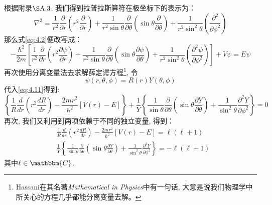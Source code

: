 \documentclass[a4paper,zihao=-4,linespread=1]{ctexrep}
\begin{document}
    根据附录$\S \rm{A}.3$, 我们得到拉普拉斯算符在极坐标下的表示为：
    \begin{equation}
        \nabla^{2}=\frac{1}{r^{2}} \frac{\partial}{\partial r}\left(r^{2} \frac{\partial}{\partial r}\right)+\frac{1}{r^{2} \sin \theta} \frac{\partial}{\partial \theta}\left(\sin \theta \frac{\partial}{\partial \theta}\right)+\frac{1}{r^{2} \sin ^{2} \theta}\left(\frac{\partial^{2}}{\partial \phi^{2}}\right)
    \end{equation}
    那么式\ref{eq:4.2}便改写成：
    \begin{equation}
        \label{eq:4.11}
        -\frac{\hbar^{2}}{2 m}\left[\frac{1}{r^{2}} \frac{\partial}{\partial r}\left(r^{2} \frac{\partial \psi}{\partial r}\right)+\frac{1}{r^{2} \sin \theta} \frac{\partial}{\partial \theta}\left(\sin \theta \frac{\partial \psi}{\partial \theta}\right)+\frac{1}{r^{2} \sin ^{2} \theta}\left(\frac{\partial^{2} \psi}{\partial \phi^{2}}\right)\right]+V \psi=E \psi
    \end{equation}
    再次使用分离变量法去求解薛定谔方程\footnote{Hassani在其名著\textit{Mathematical in Physics}中有一句话, 大意是说我们物理学中所关心的方程几乎都能分离变量去解。}, 令
    \[\psi(r,\theta,\phi)=R(r)Y(\theta,\phi)\]
    代入\ref{eq:4.11}得到:
    \begin{equation}
        \left\{\frac{1}{R} \frac{d}{d r}\left(r^{2} \frac{d R}{d r}\right)-\frac{2 m r^{2}}{\hbar^{2}}[V(r)-E]\right\}+\frac{1}{Y}\left\{\frac{1}{\sin \theta} \frac{\partial}{\partial \theta}\left(\sin \theta \frac{\partial Y}{\partial \theta}\right)+\frac{1}{\sin ^{2} \theta} \frac{\partial^{2} Y}{\partial \phi^{2}}\right\}=0
    \end{equation}
    再次, 我们又利用到两项依赖于不同的独立变量, 得到：
    \begin{align}
        &\frac{1}{R} \frac{d}{d r}\left(r^{2} \frac{d R}{d r}\right)-\frac{2 m r^{2}}{\hbar^{2}}[V(r)-E]=\ell(\ell+1) \label{eq:4.13}\\
        &\frac{1}{Y}\left\{\frac{1}{\sin \theta} \frac{\partial}{\partial \theta}\left(\sin \theta \frac{\partial Y}{\partial \theta}\right)+\frac{1}{\sin ^{2} \theta} \frac{\partial^{2} Y}{\partial \phi^{2}}\right\}=-\ell(\ell+1)\label{eq:4.14}
    \end{align}
    其中$\ell\in\mathbbm{C}$.
\end{document}
